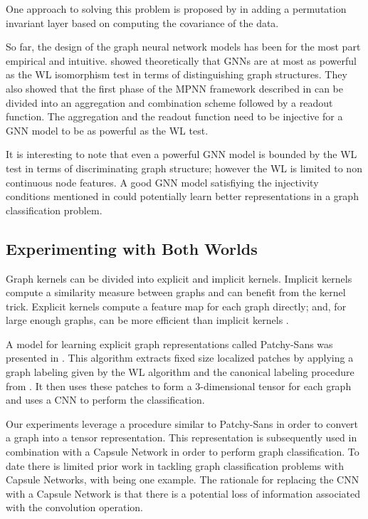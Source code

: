 \documentclass[conference]{IEEEtran}
\begin{document}
One approach to solving this problem is proposed by \cite{verma2018graph} in adding a permutation invariant layer based on computing the covariance of the data.

So far, the design of the graph neural network models has been for the most part empirical and intuitive. \cite{xu2018powerful} showed theoretically that GNNs are at most as powerful as the WL isomorphism test in terms of distinguishing graph structures. They also showed that the first phase of the MPNN framework described in \cite{gilmer2017neural} can be divided into an aggregation and combination scheme followed by a readout function. The aggregation and the readout function need to be injective for a GNN model to be as powerful as the WL test.

It is interesting to note that even a powerful GNN model is bounded by the WL test in terms of discriminating graph structure; however the WL is limited to non continuous node features. A good GNN model satisfiying the injectivity conditions mentioned in \cite{gilmer2017neural} could potentially learn better representations in a graph classification problem. 


\subsection{Experimenting with Both Worlds}

Graph kernels can be divided into explicit and implicit kernels. Implicit kernels compute a similarity measure between graphs and can benefit from the kernel trick. Explicit kernels compute a feature map for each graph directly; and, for large enough graphs, can be more efficient than implicit kernels \cite{kriege2014explicit}.

A model for learning explicit graph representations called Patchy-Sans was presented in \cite{niepert2016learning}. This algorithm extracts fixed size localized patches by applying a graph labeling given by the WL algorithm \cite{weisfeiler1968reduction} and the canonical labeling procedure from \cite{mckay2014practical}.
It then uses these patches to form a 3-dimensional tensor for each graph and uses a CNN to perform the classification.

Our experiments leverage a procedure similar to Patchy-Sans in order to convert a graph into a tensor representation. 
This representation is subsequently used in combination with a Capsule Network in order to perform graph classification. 
To date there is limited prior work in tackling graph classification problems with Capsule Networks, with  \cite{verma2018graph} being one example. The rationale for replacing the CNN with a Capsule Network is that there is a potential loss of information associated with the convolution operation. 
\end{document}
